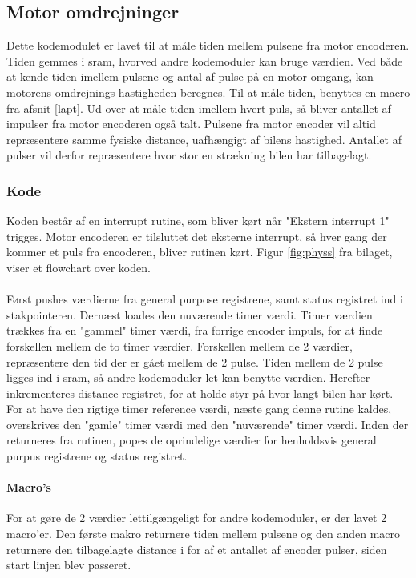 \newpage

\subsection{Motor omdrejninger}
Dette kodemodulet er lavet til at måle tiden mellem pulsene fra motor encoderen. Tiden gemmes i sram, hvorved andre kodemoduler kan bruge værdien. Ved både at kende tiden imellem pulsene og antal af pulse på en motor omgang, kan motorens omdrejnings hastigheden beregnes. Til at måle tiden, benyttes en macro fra afsnit \ref{lapt}. Ud over at måle tiden imellem hvert puls, så bliver antallet af impulser fra motor encoderen også talt. Pulsene fra motor encoder vil altid repræsentere samme fysiske distance, uafhængigt af bilens hastighed. Antallet af pulser vil derfor repræsentere hvor stor en strækning bilen har tilbagelagt.

\subsubsection{Kode}
Koden består af en interrupt rutine, som bliver kørt når "Ekstern interrupt 1" trigges. Motor encoderen er tilsluttet det eksterne interrupt, så hver gang der kommer et puls fra encoderen, bliver rutinen kørt. Figur \ref{fig:physs} fra bilaget, viser et flowchart over koden.\\
\\
Først pushes værdierne fra general purpose registrene, samt status registret ind i stakpointeren. Dernæst loades den nuværende timer værdi. Timer værdien trækkes fra en "gammel" timer værdi, fra forrige encoder impuls, for at finde forskellen mellem de to timer værdier. Forskellen mellem de 2 værdier, repræsentere den tid der er gået mellem de 2 pulse. Tiden mellem de 2 pulse ligges ind i sram, så andre kodemoduler let kan benytte værdien. Herefter inkrementeres distance registret, for at holde styr på hvor langt bilen har kørt. For at have den rigtige timer reference værdi, næste gang denne rutine kaldes, overskrives den "gamle" timer værdi med den "nuværende" timer værdi. Inden der returneres fra rutinen, popes de oprindelige værdier for henholdsvis general purpus registrene og status registret.

\paragraph{Macro's}

For at gøre de 2 værdier lettilgængeligt for andre kodemoduler, er der lavet 2 macro'er. Den første makro returnere tiden mellem pulsene og den anden macro returnere den tilbagelagte distance i for af et antallet af encoder pulser, siden start linjen blev passeret.
